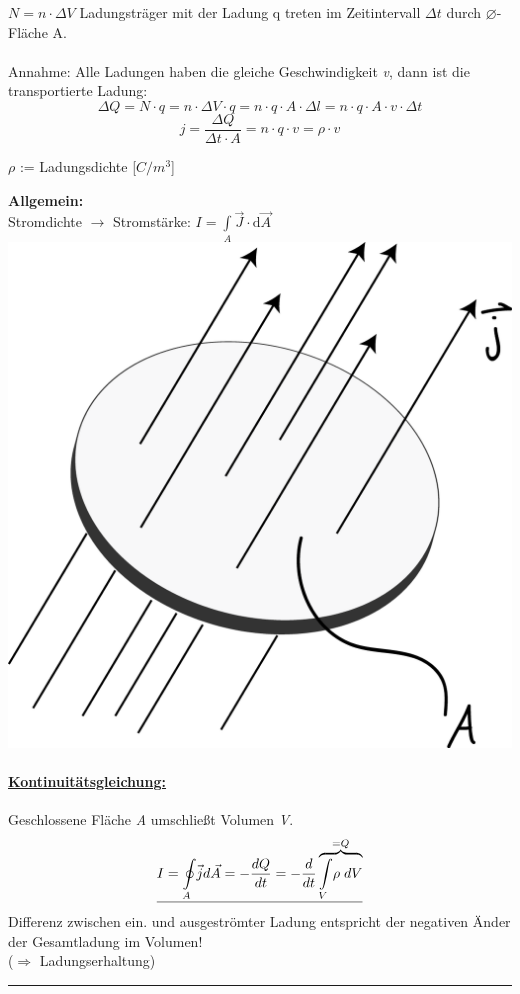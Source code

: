 \documentclass[11pt]{article}
\begin{document}
		\noindent$N=n\cdot \Delta V $ Ladungsträger  mit der Ladung q treten im Zeitintervall $\Delta t$ durch $\diameter$-Fläche A. \\
		\\
		Annahme: Alle Ladungen haben die gleiche Geschwindigkeit \emph{v}, dann ist die transportierte Ladung:
		$$\Delta Q=N\cdot q = n\cdot \Delta V \cdot q = n\cdot q \cdot A \cdot \Delta l = n \cdot q\cdot A\cdot v \cdot \Delta t$$
		$$j=\frac{\Delta Q}{\Delta t \cdot A}=n\cdot q \cdot v =  \rho \cdot v $$ \begin{flushright}
			$\rho$ := Ladungsdichte [$C/m^3$]
		\end{flushright}
		{\large \textbf{Allgemein: } } \\
		\newpage
		Stromdichte $\longrightarrow$  Stromstärke: $I = {\displaystyle \int\limits_A} \vec J \cdot \mathrm d\vec A$ \\
		\includegraphics[width=0.3\linewidth]{skizzen/15/VL06/15_2} \\
		\paragraph{\underline{Kontinuitätsgleichung:}}
		Geschlossene Fläche \emph{A} umschließt Volumen \emph{V}.
		$$\underline{I = {\displaystyle\oint\limits_A} \vec{j} d\vec{A} = -\frac{dQ}{dt} = -\frac{d}{dt} \overbrace{{\displaystyle\int\limits_V} \rho \hspace{1mm} dV}^{=Q} }$$
		Differenz zwischen ein. und ausgeströmter Ladung entspricht der negativen Änder der Gesamtladung im Volumen! \\
		($\Rightarrow$ Ladungserhaltung) \\
		\rule{\textwidth}{0.2mm}
\end{document}
